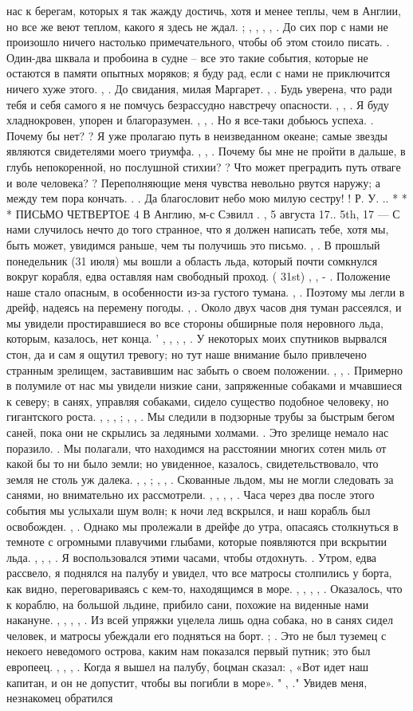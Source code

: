 нас к берегам, которых я так жажду достичь, хотя и менее теплы, чем в Англии, но все же веют теплом, какого я здесь не ждал. ; , , , , . До сих пор с нами не произошло ничего настолько примечательного, чтобы об этом стоило писать. . Один-два шквала и пробоина в судне – все это такие события, которые не остаются в памяти опытных моряков; я буду рад, если с нами не приключится ничего хуже этого. , . До свидания, милая Маргарет. , . Будь уверена, что ради тебя и себя самого я не помчусь безрассудно навстречу опасности. , , . Я буду хладнокровен, упорен и благоразумен. , , . Но я все-таки добьюсь успеха. . Почему бы нет? ? Я уже пролагаю путь в неизведанном океане; самые звезды являются свидетелями моего триумфа. , , . Почему бы мне не пройти в дальше, в глубь непокоренной, но послушной стихии? ? Что может преградить путь отваге и воле человека? ? Переполняющие меня чувства невольно рвутся наружу; а между тем пора кончать. . . Да благословит небо мою милую сестру! ! Р. У. .. * * * ПИСЬМО ЧЕТВЕРТОЕ 4 В Англию, м-с Сэвилл . , 5 августа 17.. 5th, 17 — С нами случилось нечто до того странное, что я должен написать тебе, хотя мы, быть может, увидимся раньше, чем ты получишь это письмо. , . В прошлый понедельник (31 июля) мы вошли а область льда, который почти сомкнулся вокруг корабля, едва оставляя нам свободный проход. ( 31st) , , - . Положение наше стало опасным, в особенности из-за густого тумана. , . Поэтому мы легли в дрейф, надеясь на перемену погоды. , . Около двух часов дня туман рассеялся, и мы увидели простиравшиеся во все стороны обширные поля неровного льда, которым, казалось, нет конца. ' , , , , . У некоторых моих спутников вырвался стон, да и сам я ощутил тревогу; но тут наше внимание было привлечено странным зрелищем, заставившим нас забыть о своем положении. , , . Примерно в полумиле от нас мы увидели низкие сани, запряженные собаками и мчавшиеся к северу; в санях, управляя собаками, сидело существо подобное человеку, но гигантского роста. , , , ; , , . Мы следили в подзорные трубы за быстрым бегом саней, пока они не скрылись за ледяными холмами. . Это зрелище немало нас поразило. . Мы полагали, что находимся на расстоянии многих сотен миль от какой бы то ни было земли; но увиденное, казалось, свидетельствовало, что земля не столь уж далека. , , ; , , . Скованные льдом, мы не могли следовать за санями, но внимательно их рассмотрели. , , , , . Часа через два после этого события мы услыхали шум волн; к ночи лед вскрылся, и наш корабль был освобожден. , . Однако мы пролежали в дрейфе до утра, опасаясь столкнуться в темноте с огромными плавучими глыбами, которые появляются при вскрытии льда. , , , . Я воспользовался этими часами, чтобы отдохнуть. . Утром, едва рассвело, я поднялся на палубу и увидел, что все матросы столпились у борта, как видно, переговариваясь с кем-то, находящимся в море. , , , , . Оказалось, что к кораблю, на большой льдине, прибило сани, похожие на виденные нами накануне. , , , , . Из всей упряжки уцелела лишь одна собака, но в санях сидел человек, и матросы убеждали его подняться на борт. ; . Это не был туземец с некоего неведомого острова, каким нам показался первый путник; это был европеец. , , , . Когда я вышел на палубу, боцман сказал: , «Вот идет наш капитан, и он не допустит, чтобы вы погибли в море». " , ." Увидев меня, незнакомец обратился 